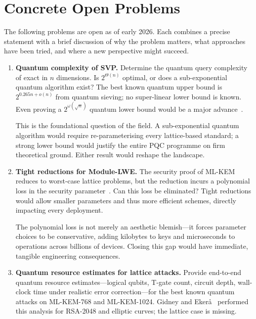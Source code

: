 \section{Concrete Open Problems}
\label{sec:open-problem-list}

The following problems are open as of early 2026.  Each combines a precise statement with a brief discussion of why the problem matters, what approaches have been tried, and where a new perspective might succeed.

\begin{enumerate}

\item \textbf{Quantum complexity of SVP.}
Determine the quantum query complexity of exact \svp{} in $n$ dimensions.  Is $2^{\Theta(n)}$ optimal, or does a sub-exponential quantum algorithm exist?  The best known quantum upper bound is $2^{0.265n + o(n)}$ from quantum sieving; no super-linear lower bound is known.  Even proving a $2^{\omega(\sqrt{n})}$ quantum lower bound would be a major advance~\cite{Regev2009}.

This is the foundational question of the field.  A sub-exponential quantum algorithm would require re-parameterising every lattice-based standard; a strong lower bound would justify the entire PQC programme on firm theoretical ground.  Either result would reshape the landscape.

\item \textbf{Tight reductions for Module-LWE.}
The security proof of ML-KEM reduces \mlwe{} to worst-case lattice problems, but the reduction incurs a polynomial loss in the security parameter~\cite{Peikert2016}.  Can this loss be eliminated?  Tight reductions would allow smaller parameters and thus more efficient schemes, directly impacting every deployment.

The polynomial loss is not merely an aesthetic blemish---it forces parameter choices to be conservative, adding kilobytes to keys and microseconds to operations across billions of devices.  Closing this gap would have immediate, tangible engineering consequences.

\item \textbf{Quantum resource estimates for lattice attacks.}
Provide end-to-end quantum resource estimates---logical qubits, T-gate count, circuit depth, wall-clock time under realistic error correction---for the best known quantum attacks on ML-KEM-768 and ML-KEM-1024.  Gidney and Eker\aa~\cite{GidneyEkera2021} performed this analysis for RSA-2048 and elliptic curves; the lattice case is missing.


\end{enumerate}
